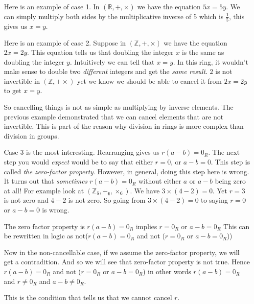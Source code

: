 \begin{example}
Here is an example of case 1. In $(\mathbb{R}, +, \times)$ we have the equation $5x = 5y$.
We can simply multiply both sides by the multiplicative inverse of 5 which is $\frac{1}{5}$, this gives us $x=y$. 
\end{example}

\begin{example}
Here is an example of case 2. Suppose in $(\mathbb{Z}, +, \times)$ we have the equation $2x = 2y$. This equation tells us that 
doubling the integer $x$ is the same as doubling the integer $y$. Intuitively we can tell that 
$x = y$. In this ring, it wouldn't make sense to double two \textit{different} integers and get the \textit{same result}. 
$2$ is not invertible in $(\mathbb{Z}, + \times)$ yet we know we should be able to cancel it from $2x = 2y$ to get $x = y$.
\end{example}


So cancelling things is not as simple as multiplying by inverse elements. The previous example 
demonstrated that we can cancel elements that are not invertible. This is part of the reason why 
division in rings is more complex than division in groups. 

\begin{example}
Case 3 is the most interesting. Rearranging gives us $r(a-b) = 0_R$. The next step
you would \textit{expect} would be to say that either $r = 0$, or $a-b = 0$. 
This step is called \textit{the zero-factor property}.
However, in general, doing this step here is wrong. It turns out 
that \textit{sometimes} $r(a-b) = 0_R$ without either $a$ or $a-b$ being zero at all! 
For example look at $(\mathbb{Z}_6, +_6, \times_{6})$.
We have $3 \times (4-2) = 0$. Yet $r = 3$ is not zero and $4-2$ is not zero. 
So going from $3 \times (4-2) = 0$ to saying $r = 0$ or $a - b = 0$ is wrong. 
\end{example}

The zero factor property is $r(a-b) = 0_R$ implies $r = 0_R$ or $a-b = 0_R$
This can be rewritten in logic as not($r(a-b) = 0_R$ and not ($r = 0_R$ or $a-b = 0_R$))

Now in the non-cancellable case, if we assume the zero-factor property, we will get a contradition.
And so we will see that zero-factor property is not true. 
Hence  $r(a-b) = 0_R$ and not ($r = 0_R$ or $a-b = 0_R$)
in other words $r(a-b) = 0_R$ and $r \neq 0_R$ and $a-b \neq 0_R$.

This is the condition that tells us that we cannot cancel $r$.

